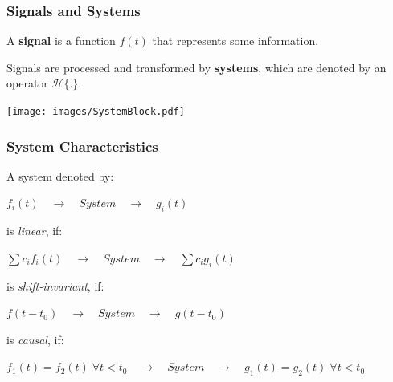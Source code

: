 

\begin{frame}
    \frametitle{Signals and Systems}
    \begin{myDefinition}
        A \textbf{signal} is a function $f(t)$ that represents some information.

        \vspace{5mm}

        Signals are processed and transformed by \textbf{systems}, which are denoted by an operator $\mathcal{H}\{.\}$.
    \end{myDefinition}
    \begin{center}
        \texttt{[image: images/SystemBlock.pdf]}
    \end{center}

\end{frame}




\begin{frame}
    \frametitle{System Characteristics}

    \begin{myDefinition}
        A system denoted by:
        \begin{center}
            $f_i(t) \quad \rightarrow \quad System \quad \rightarrow \quad g_i(t)$
        \end{center}
        is \textit{linear}, if:
        \begin{center}
            ${\sum c_if_i(t)} \quad \rightarrow \quad System \quad \rightarrow \quad {\sum c_ig_i(t)}$
        \end{center}
        is \textit{shift-invariant}, if:
        \begin{center}
            $f(t-t_0) \quad \rightarrow \quad System \quad \rightarrow \quad g(t-t_0)$
        \end{center}
        is \textit{causal}, if:
        \begin{center}
            $f_1(t) = f_2(t) \; \forall t < t_0 \quad \rightarrow \quad System \quad \rightarrow \quad g_1(t) = g_2(t) \; \forall t < t_0$
        \end{center}
    \end{myDefinition}
\end{frame}


